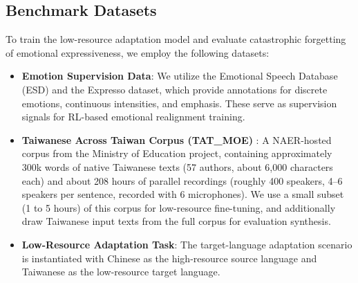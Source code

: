 \subsection{Benchmark Datasets}
To train the low-resource adaptation model and evaluate catastrophic forgetting of emotional expressiveness, we employ the following datasets:
\begin{itemize}
    \item \textbf{Emotion Supervision Data}: We utilize the Emotional Speech Database (ESD) and the Expresso dataset, which provide annotations for discrete emotions, continuous intensities, and emphasis. These serve as supervision signals for RL-based emotional realignment training.
    \item \textbf{Taiwanese Across Taiwan Corpus (TAT\_MOE)} \citep{Liao2022TATMOE}: A NAER-hosted corpus from the Ministry of Education project, containing approximately 300k words of native Taiwanese texts (57 authors, about 6,000 characters each) and about 208 hours of parallel recordings (roughly 400 speakers, 4--6 speakers per sentence, recorded with 6 microphones). We use a small subset (1 to 5 hours) of this corpus for low-resource fine-tuning, and additionally draw Taiwanese input texts from the full corpus for evaluation synthesis.
    \item \textbf{Low-Resource Adaptation Task}: The target-language adaptation scenario is instantiated with Chinese as the high-resource source language and Taiwanese as the low-resource target language.
\end{itemize}

